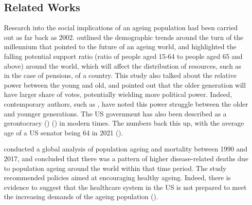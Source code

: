 \documentclass[11pt]{article}
\begin{document}
\subsection*{Related Works}
Research into the social implications of an ageing population had been carried out as far back as 2002. \cite{tinker2002social} outlined the demographic trends around the turn of the millennium that pointed to the future of an ageing world, and highlighted the falling potential support ratio (ratio of people aged 15-64 to people aged 65 and above) around the world, which will affect the distribution of resources, such as in the case of pensions, of a country. This study also talked about the relative power between the young and old, and pointed out that the older generation will have larger share of votes, potentially wielding more political power. Indeed, contemporary authors, such as \cite{Munger+2022}, have noted this power struggle between the older and younger generations. The US government has also been described as a gerontocracy (\cite{noah_2019}) (\cite{thompson_2020}) in modern times. The numbers back this up, with the average age of a US senator being 64 in 2021 (\cite{manning_2022}).

\cite{Cheng2020} conducted a global analysis of population ageing and mortality between 1990 and 2017, and concluded that there was a pattern of higher disease-related deaths due to population ageing around the world within that time period. The study recommended policies aimed at encouraging healthy ageing. Indeed, there is evidence to suggest that the healthcare system in the US is not prepared to meet the increasing demands of the ageing population (\cite{foley_retooling_2020}).



\end{document}

